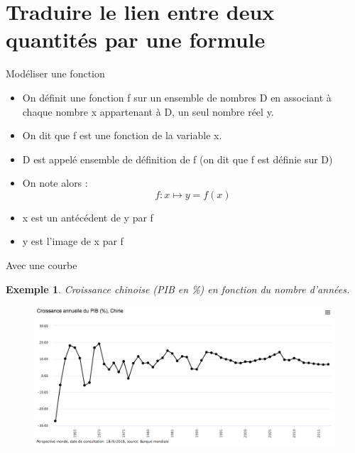 \documentclass[presentation]{beamer}
\newtheorem{exe}{Exemple}[section]
\begin{document}
\section{Traduire le lien entre deux quantités par une formule}
\label{sec:org6a75f35}
\begin{frame}[label={sec:orgc0d524a}]{Modéliser une fonction}
\begin{definition}
\begin{itemize}
\item On définit une fonction f sur un ensemble de nombres D en
associant à chaque nombre x appartenant à D, \alert{un seul} nombre
réel \alert{y}.
\item On dit que f est une fonction de la \alert{variable} x.
\item D est appelé \alert{ensemble de définition} de f (on dit que f \alert{est
définie sur D})
\item On note alors : \[f : x\mapsto y = f(x)\]
\item x est \alert{un antécédent} de y par f
\item y est \alert{l'image} de x par f
\end{itemize}
\end{definition}
\end{frame}

\begin{frame}[label={sec:org1c6960b}]{Avec une courbe}
\begin{exe}
Croissance chinoise (PIB en \%) en fonction du nombre d'années.
\end{exe}

\begin{figure}
\begin{center}
\includegraphics[width=.95\textwidth]{croissance-chinoise.png}
\end{center}
\end{figure}
\end{frame}
\end{document}
